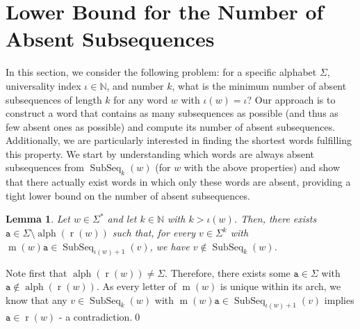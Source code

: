 \documentclass[10pt,a4paper]{amsart}
\makeatletter
\newcommand{\N}{\mathbb{N}}
\def\ta{\mathtt{a}}
\def\r{\operatorname{r}}
\def\m{\operatorname{m}}
\DeclareMathOperator{\alphabet}{alph}
\DeclareMathOperator{\al}{alph}
\DeclareMathOperator\ScatFact{SubSeq}
\newif\ifpaper
\theoremstyle{plain}
\newtheorem{lemma}{Lemma}
\theoremstyle{definition}
\renewenvironment{proof}[1][\proofname]{\par
  \pushQED{}%
  \normalfont \topsep6\p@\@plus6\p@\relax
  \trivlist
  \item[\hskip\labelsep\itshape #1\@addpunct{.}]\ignorespaces
}{%
  \popQED\endtrivlist\@endpefalse
}
\makeatother
\begin{document}
	\section{Lower Bound for the Number of Absent Subsequences}\label{sec:lowbound}
In this section, we consider the following problem: for a specific alphabet $\Sigma$, universality index $\iota\in\N$, and number $k$, what is the minimum number of absent subsequences of length $k$ for any word $w$ with $\iota(w) = \iota$? Our approach is to construct a word that contains as many subsequences as possible (and thus as few absent ones as possible) and compute its number of absent subsequences. Additionally, we are particularly interested in finding the shortest words fulfilling this property. We start by understanding which words are always absent subsequences from $\ScatFact_k(w)$ (for $w$ with the above properties) and show that there actually exist words in which only these words are absent, providing a tight lower bound on the number of absent subsequences.

\ifpaper
\else 
\begin{lemma}\label{lemma:atleast-absent-sf}
    Let $ w \in \Sigma^*$ and let $k \in \N$ with $k > \iota(w)$. Then, there exists $\ta \in \Sigma\setminus \al(\r(w))$ such that, for every $v \in \Sigma^k$ with $\m(w)\ta \in \ScatFact_{\iota(w)+1}(v)$, we have $v\notin\ScatFact_k(w)$.
\end{lemma}

\begin{proof}
    Note first that $\alphabet(\r(w)) \neq \Sigma$. Therefore, there exists some $\ta\in\Sigma$ with $\ta\notin\alphabet(\r(w))$. As every letter of $\m(w)$ is unique within its arch, we know that any $v\in\ScatFact_k(w)$
    with $\m(w) \ta \in \ScatFact_{\iota(w)+1}(v)$ implies $\ta\in\r(w)$ - a contradiction.\qed
\end{proof}

\fi

\end{document}

